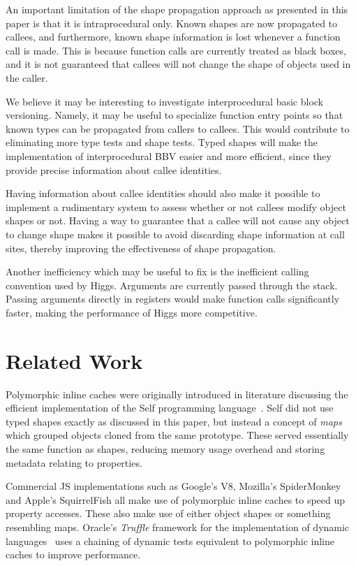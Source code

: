 \documentclass[preprint]{sigplanconf}
\begin{document}
An important limitation of the shape propagation approach as presented in this
paper is that it is intraprocedural only. Known shapes are now propagated to
callees, and furthermore, known shape information is lost whenever a
function call is made. This is because function calls are currently treated
as black boxes, and it is not guaranteed that callees will not change the shape
of objects used in the caller.

We believe it may be interesting to investigate interprocedural basic block
versioning. Namely, it may be useful to specialize function entry points so
that known types can be propagated from callers to callees. This would
contribute to eliminating more type tests and shape tests. Typed
shapes will make the implementation of interprocedural BBV easier and more
efficient, since they provide precise information about callee identities.

Having information about callee identities should also make it possible to
implement a rudimentary system to assess whether or not callees
modify object shapes or not. Having a way to guarantee that a callee will not
cause any object to change shape makes it possible to avoid discarding shape
information at call sites, thereby improving the effectiveness of shape
propagation.

Another inefficiency which may be useful to fix is the inefficient calling
convention used by Higgs. Arguments are currently passed through the stack.
Passing arguments directly in registers would make function calls
significantly faster, making the performance of Higgs more competitive.

 
\section{Related Work}




Polymorphic inline caches were originally introduced in literature discussing
the efficient implementation of the Self programming
language~\cite{self, self_pic}. Self did not use typed shapes exactly as
discussed in this paper, but instead a concept of {\em maps} which grouped
objects cloned from the same prototype. These served essentially the same
function as shapes, reducing memory usage overhead and storing metadata
relating to properties.



Commercial JS implementations such as Google's V8, Mozilla's
SpiderMonkey and Apple's SquirrelFish all make use of polymorphic inline
caches to speed up property accesses. These also make use of either object
shapes or something resembling maps. Oracle's {\em Truffle} framework for the
implementation of dynamic languages~\cite{trufflejs, truffle} uses a chaining
of dynamic tests equivalent to polymorphic inline caches to improve
performance.
\end{document}
